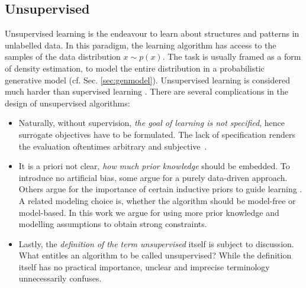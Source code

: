 	\subsection{Unsupervised}\label{sec:unsupervised}
		{Unsupervised learning} is the endeavour to learn about structures and patterns in unlabelled data. In this paradigm, the learning algorithm has access to the samples of the data distribution $x \sim p(x)$. The task is usually framed as a form of density estimation, \ie to model the entire distribution in a probabilistic generative model (cf. Sec. \ref{sec:genmodel}).
		Unsupervised learning is considered much harder than supervised learning \cite{bishop06pattern}. There are several complications in the design of unsupervised algorithms:
		\begin{itemize}
			\item Naturally, without supervision, \textit{the goal of learning is not specified}, hence surrogate objectives have to be formulated. The lack of specification renders the evaluation oftentimes arbitrary and subjective~\cite{theis15evalgen}.
			\item It is a priori not clear, \textit{how much prior knowledge} should be embedded. To introduce no artificial bias, some argue for a purely data-driven approach. Others argue for the importance of certain inductive priors to guide learning \cite{tenenbaum18think}.
			A related modeling choice is, whether the algorithm should be model-free or model-based.
			In this work we argue for using more prior knowledge and modelling assumptions to obtain strong constraints.
			\item Lastly, the \textit{definition of the term unsupervised} itself is subject to discussion. What entitles an algorithm to be called unsupervised? While the definition itself has no practical importance, unclear and imprecise terminology unnecessarily confuses.



		\end{itemize}

